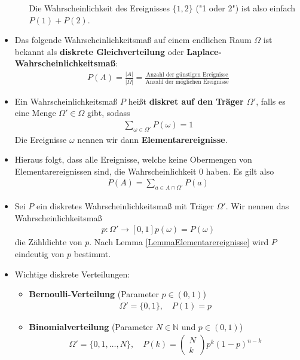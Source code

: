 \documentclass{scrartcl}
\begin{document}
\begin{itemize}
\begin{itemize}
        Die Wahrscheinlichkeit des Ereignisses $\{1,2\}$ ("1 oder 2") ist also einfach $P(1) + P(2)$.
    \end{itemize}
    \item Das folgende Wahrscheinlichkeitsmaß auf einem endlichen Raum $\Omega$ ist bekannt als \textbf{diskrete Gleichverteilung} oder \textbf{Laplace-Wahrscheinlichkeitsmaß}:
    \begin{align*}
        P(A) = \frac{|A|}{|\Omega|} = \frac{\text{Anzahl der günstigen Ereignisse}}{\text{Anzahl der möglichen Ereignisse}}
    \end{align*}
    \item Ein Wahrscheinlichkeitsmaß $P$ heißt \textbf{diskret auf den Träger $\Omega'$}, falls es eine Menge $\Omega' \in \Omega$ gibt, sodass
    \begin{align*}
        \sum_{\omega \in \Omega'} P(\omega) = 1
    \end{align*}
    Die Ereignisse $\omega$ nennen wir dann \textbf{Elementarereignisse}.
    \item Hieraus folgt, dass alle Ereignisse, welche keine Obermengen von Elementarereignissen sind, die Wahrscheinlichkeit $0$ haben. Es gilt also
    \begin{align}
        P(A) = \sum_{a \in A \cap \Omega'} P(a)
        \label{LemmaElementarereignisse}
    \end{align}
    \item Sei $P$ ein diskretes Wahrscheinlichkeitsmaß mit Träger $\Omega'$. Wir nennen das Wahrscheinlichkeitsmaß
    \begin{align*}
        p: \Omega' \to [0,1] p(\omega) = P(\omega)
    \end{align*}
    die Zähldichte von $p$. Nach Lemma \ref{LemmaElementarereignisse} wird $P$ eindeutig von $p$ bestimmt. 
    \item Wichtige diskrete Verteilungen:
    \begin{itemize}
        \item \textbf{Bernoulli-Verteilung} (Parameter $p \in (0,1)$)
        \begin{align*}
            \Omega' = \{0,1\},\quad P(1) = p
        \end{align*}
        \item \textbf{Binomialverteilung} (Parameter $N \in \mathbb{N}$ und $p \in (0,1)$)
        \begin{align*}
            \Omega' = \{0,1,\hdots,N\},\quad P(k) = \begin{pmatrix}N\\k\end{pmatrix}p^k(1-p)^{n-k}

\end{align*}
\end{itemize}
\end{itemize}
\end{document}
